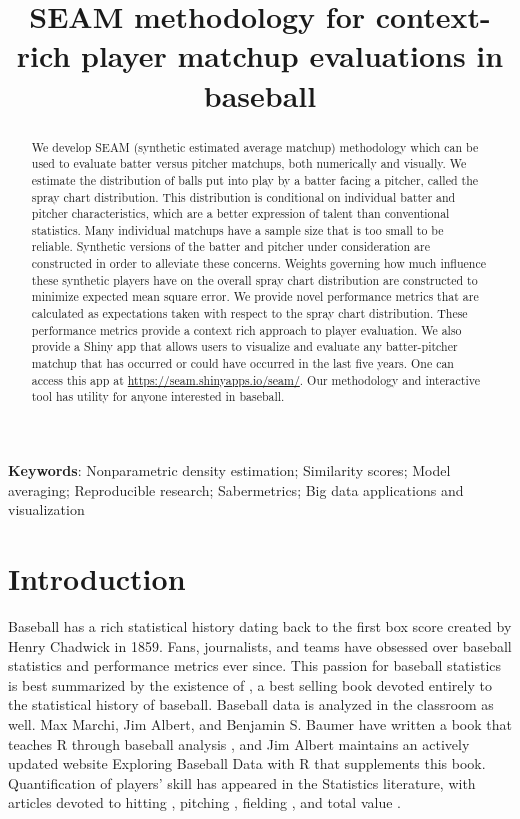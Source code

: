 \documentclass[12pt]{article}
\title{SEAM methodology for context-rich player matchup evaluations in baseball}
\date{}
\begin{document}
\maketitle

\begin{abstract}
We develop SEAM (synthetic estimated average matchup) methodology which can be used to evaluate batter versus pitcher matchups, both numerically and visually. We estimate the distribution of balls put into play by a batter facing a pitcher, called the spray chart distribution. This distribution is conditional on individual batter and pitcher characteristics, which are a better expression of talent than conventional statistics. Many individual matchups have a sample size that is too small to be reliable. Synthetic versions of the batter and pitcher under consideration are constructed in order to alleviate these concerns. Weights governing how much influence these synthetic players have on the overall spray chart distribution are constructed to minimize expected mean square error. We provide novel performance metrics that are calculated as expectations taken with respect to the spray chart distribution. These performance metrics provide a context rich approach to player evaluation. We also provide a Shiny app that allows users to visualize and evaluate any batter-pitcher matchup that has occurred or could have occurred in the last five years. One can access this app at \url{https://seam.shinyapps.io/seam/}. Our methodology and interactive tool has utility for anyone interested in baseball.
\end{abstract}

\noindent\textbf{Keywords}: Nonparametric density estimation; Similarity scores; Model averaging; Reproducible research; Sabermetrics; Big data applications and visualization


\section{Introduction}

Baseball has a rich statistical history dating back to the first box score created by Henry Chadwick in 1859. Fans, journalists, and teams have obsessed over baseball statistics and performance metrics ever since. This passion for baseball statistics is best summarized by the existence of \cite{schwarz2004numbers}, a best selling book devoted entirely to the statistical history of baseball. Baseball data is analyzed in the classroom as well. Max Marchi, Jim Albert, and Benjamin S. Baumer have written a book that teaches R through baseball analysis \citep{marchi2019analyzing}, and Jim Albert maintains an actively updated website Exploring Baseball Data with R that supplements this book. 
Quantification of players' skill has appeared in the Statistics literature, with articles devoted to
hitting \citep{berry1999bridging, albert2008streaky, brown2008season, jensen2009hierarchical},
pitching \citep{albert2006pitching, shinya2017pitching},
fielding \citep{jensen2009bayesball, piette2012estimating}, 
and total value \citep{baumer2015openwar}.
\end{document}
